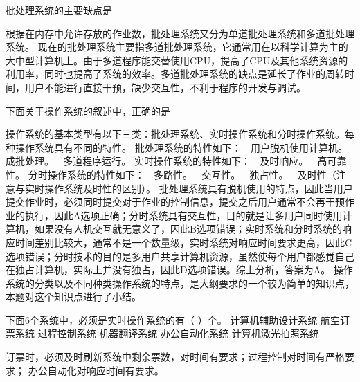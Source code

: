 \question 批处理系统的主要缺点是
\par{}
\begin{solution}根据在内存中允许存放的作业数，批处理系统又分为单道批处理系统和多道批处理系统。
现在的批处理系统主要指多道批处理系统，它通常用在以科学计算为主的大中型计算机上。由于多道程序能交替使用CPU，提高了CPU及其他系统资源的利用率，同时也提高了系统的效率。多道批处理系统的缺点是延长了作业的周转时间，用户不能进行直接干预，缺少交互性，不利于程序的开发与调试。
\end{solution}
\question 下面关于操作系统的叙述中，正确的是
\par{}
\begin{solution}操作系统的基本类型有以下三类：批处理系统、实时操作系统和分时操作系统。每种操作系统具有不同的特性。
批处理系统的特性如下：  用户脱机使用计算机。  成批处理。 
多道程序运行。 实时操作系统的特性如下：  及时响应。  高可靠性。
分时操作系统的特性如下：  多路性。  交互性。  独占性。 
及时性（注意与实时操作系统及时性的区别）。
批处理系统具有脱机使用的特点，因此当用户提交作业时，必须同时提交对于作业的控制信息，提交之后用户通常不会再干预作业的执行，因此A选项正确；分时系统具有交互性，目的就是让多用户同时使用计算机，如果没有人机交互就无意义了，因此B选项错误；实时系统和分时系统的响应时间差别比较大，通常不是一个数量级，实时系统对响应时间要求更高，因此C选项错误；分时技术的目的是多用户共享计算机资源，虽然使每个用户都感觉自己在独占计算机，实际上并没有独占，因此D选项错误。综上分析，答案为A。
操作系统的分类以及不同种类操作系统的特点，是大纲要求的一个较为简单的知识点，本题对这个知识点进行了小结。
\end{solution}
\question 下面6个系统中，必须是实时操作系统的有（ ）个。 计算机辅助设计系统
航空订票系统 过程控制系统 机器翻译系统 办公自动化系统 计算机激光拍照系统
\par{}
\begin{solution}订票时，必须及时刷新系统中剩余票数，对时间有要求；过程控制对时间有严格要求；
办公自动化对响应时间有要求。
\end{solution}
